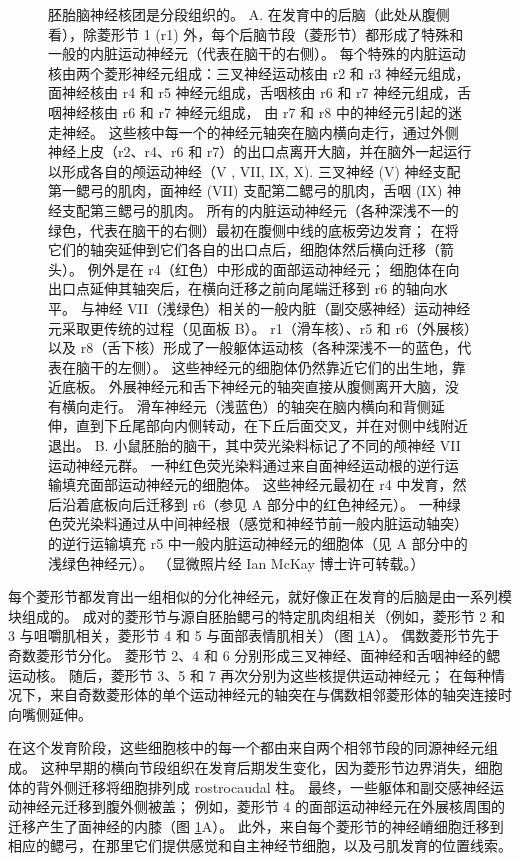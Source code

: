 \begin{figure}[htbp]
	\caption{胚胎脑神经核团是分段组织的。 A. 在发育中的后脑（此处从腹侧看），除菱形节 1 (r1) 外，每个后脑节段（菱形节）都形成了特殊和一般的内脏运动神经元（代表在脑干的右侧）。 每个特殊的内脏运动核由两个菱形神经元组成：三叉神经运动核由 r2 和 r3 神经元组成，面神经核由 r4 和 r5 神经元组成，舌咽核由 r6 和 r7 神经元组成，舌咽神经核由 r6 和 r7 神经元组成， 由 r7 和 r8 中的神经元引起的迷走神经。 这些核中每一个的神经元轴突在脑内横向走行，通过外侧神经上皮（r2、r4、r6 和 r7）的出口点离开大脑，并在脑外一起运行以形成各自的颅运动神经（V , VII, IX, X). 三叉神经 (V) 神经支配第一鳃弓的肌肉，面神经 (VII) 支配第二鳃弓的肌肉，舌咽 (IX) 神经支配第三鳃弓的肌肉。 所有的内脏运动神经元（各种深浅不一的绿色，代表在脑干的右侧）最初在腹侧中线的底板旁边发育； 在将它们的轴突延伸到它们各自的出口点后，细胞体然后横向迁移（箭头）。 例外是在 r4（红色）中形成的面部运动神经元； 细胞体在向出口点延伸其轴突后，在横向迁移之前向尾端迁移到 r6 的轴向水平。 与神经 VII（浅绿色）相关的一般内脏（副交感神经）运动神经元采取更传统的过程（见面板 B）。 r1（滑车核）、r5 和 r6（外展核）以及 r8（舌下核）形成了一般躯体运动核（各种深浅不一的蓝色，代表在脑干的左侧）。 这些神经元的细胞体仍然靠近它们的出生地，靠近底板。 外展神经元和舌下神经元的轴突直接从腹侧离开大脑，没有横向走行。 滑车神经元（浅蓝色）的轴突在脑内横向和背侧延伸，直到下丘尾部向内侧转动，在下丘后面交叉，并在对侧中线附近退出。 B. 小鼠胚胎的脑干，其中荧光染料标记了不同的颅神经 VII 运动神经元群。 一种红色荧光染料通过来自面神经运动根的逆行运输填充面部运动神经元的细胞体。 这些神经元最初在 r4 中发育，然后沿着底板向后迁移到 r6（参见 A 部分中的红色神经元）。 一种绿色荧光染料通过从中间神经根（感觉和神经节前一般内脏运动轴突）的逆行运输填充 r5 中一般内脏运动神经元的细胞体（见 A 部分中的浅绿色神经元）。 （显微照片经 Ian McKay 博士许可转载。）}
	\label{fig:40_5}
\end{figure}

每个菱形节都发育出一组相似的分化神经元，就好像正在发育的后脑是由一系列模块组成的。 成对的菱形节与源自胚胎鳃弓的特定肌肉组相关（例如，菱形节 2 和 3 与咀嚼肌相关，菱形节 4 和 5 与面部表情肌相关）（图 \ref{fig:40_5}A）。 偶数菱形节先于奇数菱形节分化。 菱形节 2、4 和 6 分别形成三叉神经、面神经和舌咽神经的鳃运动核。 随后，菱形节 3、5 和 7 再次分别为这些核提供运动神经元； 在每种情况下，来自奇数菱形体的单个运动神经元的轴突在与偶数相邻菱形体的轴突连接时向嘴侧延伸。

在这个发育阶段，这些细胞核中的每一个都由来自两个相邻节段的同源神经元组成。 这种早期的横向节段组织在发育后期发生变化，因为菱形节边界消失，细胞体的背外侧迁移将细胞排列成 rostrocaudal 柱。 最终，一些躯体和副交感神经运动神经元迁移到腹外侧被盖； 例如，菱形节 4 的面部运动神经元在外展核周围的迁移产生了面神经的内膝（图 \ref{fig:40_5}A）。 此外，来自每个菱形节的神经嵴细胞迁移到相应的鳃弓，在那里它们提供感觉和自主神经节细胞，以及弓肌发育的位置线索。

